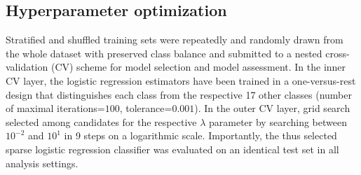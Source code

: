 \documentclass[runningheads,a4paper]{llncs}
\begin{document}
\subsection{Hyperparameter optimization}
Stratified and shuffled training sets were repeatedly and randomly drawn
from the whole dataset with preserved class balance
and submitted
to a nested cross-validation (CV) scheme
for model selection and model assessment.
In the inner CV layer, the logistic regression estimators
have been trained in a one-versus-rest design that
distinguishes each class from
the respective 17 other classes
(number of maximal iterations=$100$, tolerance=$0.001$).
In the outer CV layer, grid search
selected among candidates for the respective $\lambda$ parameter
by searching between $10^{-2}$ and $10^{1}$ in 9 steps on a logarithmic scale.
Importantly, the thus selected sparse logistic regression classifier was
evaluated on an identical test set in all analysis settings.
\end{document}
